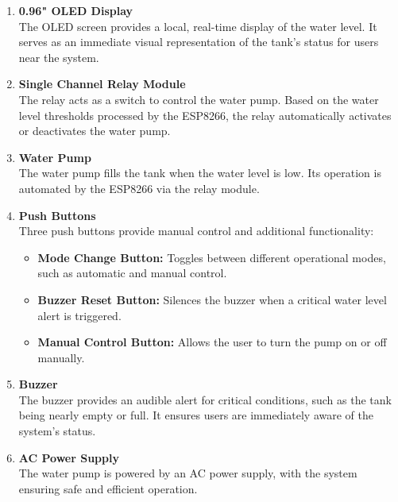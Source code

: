 {\begin{enumerate}
  \item \textbf{0.96" OLED Display}\\
The OLED screen provides a local, real-time display of the water level. It serves as an immediate visual representation of the tank's status for users near the system.

  \item \textbf{Single Channel Relay Module}\\
The relay acts as a switch to control the water pump. Based on the water level thresholds processed by the ESP8266, the relay automatically activates or deactivates the water pump.

  \item \textbf{Water Pump}\\
The water pump fills the tank when the water level is low. Its operation is automated by the ESP8266 via the relay module.

  \item \textbf{Push Buttons}\\
    Three push buttons provide manual control and additional functionality:
    \begin{itemize}
      \item \textbf{Mode Change Button:} Toggles between different operational modes, such as automatic and manual control.
      \item \textbf{Buzzer Reset Button:} Silences the buzzer when a critical water level alert is triggered.
      \item \textbf{Manual Control Button:} Allows the user to turn the pump on or off manually.
    \end{itemize}

  \item \textbf{Buzzer}\\
The buzzer provides an audible alert for critical conditions, such as the tank being nearly empty or full. It ensures users are immediately aware of the system's status.

  \item \textbf{AC Power Supply}\\
The water pump is powered by an AC power supply, with the system ensuring safe and efficient operation.
\end{enumerate}

}
